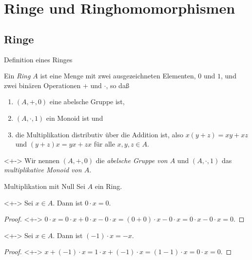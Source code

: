 \section{Ringe und Ringhomomorphismen}

\subsection{Ringe}

\begin{frame}{Definition eines Ringes}
    \begin{definition}
        Ein \emph{Ring \(A\)} ist eine Menge mit zwei ausgezeichneten Elementen,
        \(0\) und \(1\), und zwei binären Operationen \(+\) und \(\cdot\), so daß
        \pause
        \begin{enumerate}[<+->]
        \item
            \((A, +, 0)\) eine abelsche Gruppe ist,
        \item
            \((A, \cdot, 1)\) ein Monoid ist und
        \item
            die Multiplikation distributiv über die Addition ist, also
            \(x (y + z) = x y + x z\) und \((y + z) x = y x + z x\) für
            alle \(x, y, z \in A\).
        \end{enumerate}
    \end{definition}
    \begin{visibleenv}<+->
        Wir nennen \((A, +, 0)\) die \emph{abelsche Gruppe von \(A\)} und
        \((A, \cdot, 1)\) das \emph{multiplikative Monoid von \(A\)}.
    \end{visibleenv}
\end{frame}

\begin{frame}{Multiplikation mit Null}
    Sei \(A\) ein Ring.
    \begin{proposition}<+->
        Sei \(x \in A\). Dann ist \(0 \cdot x = 0\).
    \end{proposition}
    \begin{proof}<+->
        \(0 \cdot x = 0 \cdot x + 0 \cdot x - 0 \cdot x
        = (0 + 0) \cdot x - 0 \cdot x = 0 \cdot x - 0 \cdot x = 0.\)
    \end{proof}
    \begin{corollary}<+->
        Sei \(x \in A\). Dann ist \((-1) \cdot x = -x\).
    \end{corollary}
    \begin{proof}<+->
        \(x + (-1) \cdot x = 1 \cdot x + (-1) \cdot x
        = (1 - 1) \cdot x = 0 \cdot x = 0\).
    \end{proof}
\end{frame}

